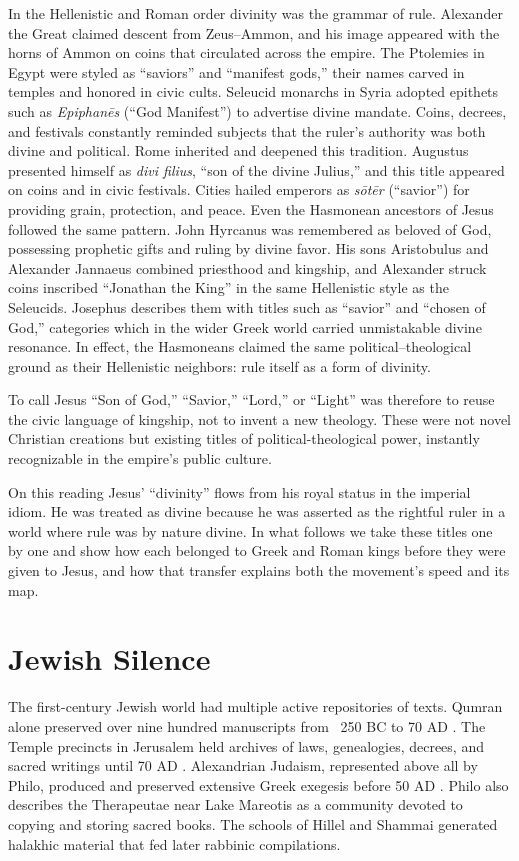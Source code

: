 In the Hellenistic and Roman order divinity was the grammar of rule.
Alexander the Great claimed descent from Zeus–Ammon, and his image appeared with the horns of Ammon on coins that circulated across the empire.
The Ptolemies in Egypt were styled as “saviors” and “manifest gods,” their names carved in temples and honored in civic cults.
Seleucid monarchs in Syria adopted epithets such as \emph{Epiphanēs} (“God Manifest”) to advertise divine mandate.
Coins, decrees, and festivals constantly reminded subjects that the ruler’s authority was both divine and political.
Rome inherited and deepened this tradition.
Augustus presented himself as \emph{divi filius}, “son of the divine Julius,” and this title appeared on coins and in civic festivals.
Cities hailed emperors as \emph{sōtēr} (“savior”) for providing grain, protection, and peace.
Even the Hasmonean ancestors of Jesus followed the same pattern.
John Hyrcanus was remembered as beloved of God, possessing prophetic gifts and ruling by divine favor.
His sons Aristobulus and Alexander Jannaeus combined priesthood and kingship, and Alexander struck coins inscribed “Jonathan the King” in the same Hellenistic style as the Seleucids.
Josephus describes them with titles such as “savior” and “chosen of God,” categories which in the wider Greek world carried unmistakable divine resonance.
In effect, the Hasmoneans claimed the same political–theological ground as their Hellenistic neighbors: rule itself as a form of divinity.

To call Jesus “Son of God,” “Savior,” “Lord,” or “Light” was therefore to reuse the civic language of kingship, not to invent a new theology.
These were not novel Christian creations but existing titles of political-theological power, instantly recognizable in the empire’s public culture.

On this reading Jesus’ “divinity” flows from his royal status in the imperial idiom.
He was treated as divine because he was asserted as the rightful ruler in a world where rule was by nature divine.
In what follows we take these titles one by one and show how each belonged to Greek and Roman kings before they were given to Jesus, and how that transfer explains both the movement’s speed and its map.

\section{Jewish Silence}\label{sec:jewish-silence}

The first-century Jewish world had multiple active repositories of texts.
Qumran alone preserved over nine hundred manuscripts from ~250 BC to 70 AD .
The Temple precincts in Jerusalem held archives of laws, genealogies, decrees, and sacred writings until 70 AD .
Alexandrian Judaism, represented above all by Philo, produced and preserved extensive Greek exegesis before 50 AD .
Philo also describes the Therapeutae near Lake Mareotis as a community devoted to copying and storing sacred books.
The schools of Hillel and Shammai generated halakhic material that fed later rabbinic compilations.

